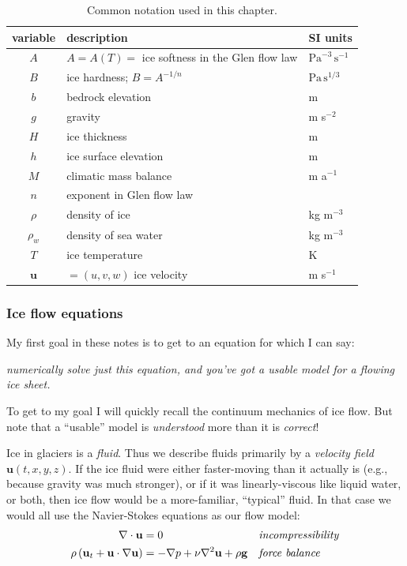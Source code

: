 \documentclass[titlepage,letterpaper,final,12pt]{scrartcl}
\begin{document}
\medskip
  \centerline{}

\begin{table}%
\caption{Common notation used in this chapter.}
\label{tab:notation}
\begin{tabular}{cll}
variable  & description & SI units \\ 
\hline
$A$ & $A=A(T)=$ ice softness in the Glen flow law & $\text{Pa}^{-3}\,\text{s}^{-1}$ \\
$B$ & ice hardness; $B=A^{-1/n}$ & $\text{Pa}\,\text{s}^{1/3}$ \\
$b$ & bedrock elevation & m \\
$g$ & gravity & m s$^{-2}$ \\
$H$ & ice thickness & m \\
$h$ & ice surface elevation & m \\
$M$ & climatic mass balance & m a$^{-1}$ \\
$n$ & exponent in Glen flow law & \\
$\rho$ & density of ice & kg m$^{-3}$ \\
$\rho_w$ & density of sea water & kg m$^{-3}$ \\
$T$ & ice temperature & K \\
$\mathbf{u}$ & $=(u,v,w)$ ice velocity & m s$^{-1}$ \\
\end{tabular}
\end{table}

\subsubsection*{Ice flow equations}  My first goal in these notes is to get to an equation for which I can say:
\begin{center}
\emph{numerically solve just this equation, and you've got a usable model for a flowing ice sheet.}
\end{center}
To get to my goal I will quickly recall the continuum mechanics of ice flow.  But note that a ``usable'' model is \emph{understood} more than it is \emph{correct}!

Ice in glaciers is a \emph{fluid}.  Thus we describe fluids primarily by a \emph{velocity field} $\mathbf{u}(t,x,y,z)$.  If the ice fluid were either faster-moving than it actually is (e.g., because gravity was much stronger), or if it was linearly-viscous like liquid water, or both, then ice flow would be a more-familiar, ``typical'' fluid.  In that case we would all use the Navier-Stokes equations as our flow model:
\begin{align}
\nabla \cdot \mathbf{u} &= 0 &&\text{\emph{incompressibility}} \label{incompressible} \\
\rho \left(\mathbf{u}_t + \mathbf{u}\cdot\nabla \mathbf{u}\right) &= -\nabla p + \nu \nabla^2 \mathbf{u} + \rho \mathbf{g} &&\text{\emph{force balance}} \label{stokes}
\end{align}
\end{document}
